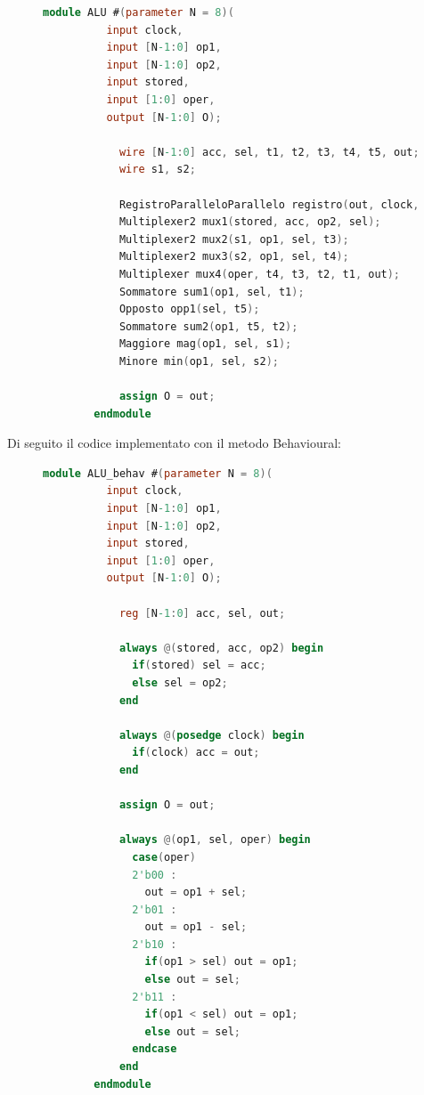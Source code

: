 \documentclass[a4paper]{article}
\theoremstyle{break}
\theoremstyle{break}
\theoremstyle{break}
\theoremstyle{break}
\begin{document}
    \begin{figure}[H]
      \begin{lstlisting}[language=Verilog]
        module ALU #(parameter N = 8)(
          input clock,
          input [N-1:0] op1,
          input [N-1:0] op2,
          input stored,
          input [1:0] oper,
          output [N-1:0] O);
          
            wire [N-1:0] acc, sel, t1, t2, t3, t4, t5, out;
            wire s1, s2;

            RegistroParalleloParallelo registro(out, clock, acc);
            Multiplexer2 mux1(stored, acc, op2, sel);
            Multiplexer2 mux2(s1, op1, sel, t3);
            Multiplexer2 mux3(s2, op1, sel, t4);
            Multiplexer mux4(oper, t4, t3, t2, t1, out);
            Sommatore sum1(op1, sel, t1);
            Opposto opp1(sel, t5);
            Sommatore sum2(op1, t5, t2);
            Maggiore mag(op1, sel, s1);
            Minore min(op1, sel, s2);

            assign O = out;
        endmodule
      \end{lstlisting}
    \end{figure}

    Di seguito il codice implementato con il metodo Behavioural:
    \begin{figure}[H]
      \begin{lstlisting}[language=Verilog]
        module ALU_behav #(parameter N = 8)(
          input clock,
          input [N-1:0] op1,
          input [N-1:0] op2,
          input stored,
          input [1:0] oper,
          output [N-1:0] O);

            reg [N-1:0] acc, sel, out;

            always @(stored, acc, op2) begin
              if(stored) sel = acc;
              else sel = op2;
            end

            always @(posedge clock) begin
              if(clock) acc = out;
            end

            assign O = out;

            always @(op1, sel, oper) begin
              case(oper)
              2'b00 :
                out = op1 + sel;
              2'b01 :
                out = op1 - sel;
              2'b10 :
                if(op1 > sel) out = op1;
                else out = sel;
              2'b11 :
                if(op1 < sel) out = op1;
                else out = sel;
              endcase
            end
        endmodule
      \end{lstlisting}
    \end{figure}
\end{document}
